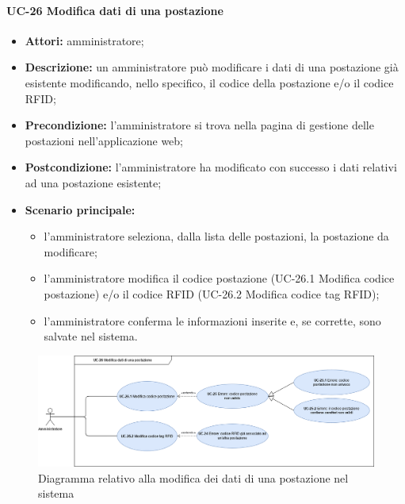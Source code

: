 \paragraph{UC-26 Modifica dati di una postazione}
\begin{itemize}
    \item \textbf{Attori:} amministratore;
    \item \textbf{Descrizione:} un amministratore pu\`{o} modificare i dati di una postazione già esistente modificando, nello specifico, il codice della postazione e/o il codice RFID;
    \item \textbf{Precondizione:} l'amministratore si trova nella pagina di gestione delle postazioni nell'applicazione web;
    \item \textbf{Postcondizione:} l'amministratore ha modificato con successo i dati relativi ad una postazione esistente;
    \item \textbf{Scenario principale:}
    \begin{itemize}
        \item l'amministratore seleziona, dalla lista delle postazioni, la postazione da modificare;
        \item l'amministratore modifica il codice postazione (UC-26.1 Modifica codice postazione) e/o il codice RFID (UC-26.2 Modifica codice tag RFID);
        \item l'amministratore conferma le informazioni inserite e, se corrette, sono salvate nel sistema.
    \end{itemize}
\end{itemize}

\begin{figure}[H]
    \centering
      \includegraphics[scale=0.35]{src/CasiDUso/immagini/ModificaPostazione.png}
    \caption{Diagramma relativo alla modifica dei dati di una postazione nel sistema}
\end{figure}



